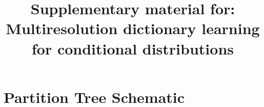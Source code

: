 \documentclass{article} %
\title{Supplementary material for: Multiresolution dictionary learning for conditional distributions}
\providecommand{\mc}[1]{\mathcal{#1}}
\begin{document}
\maketitle



\section{Partition Tree Schematic}
\end{document}
